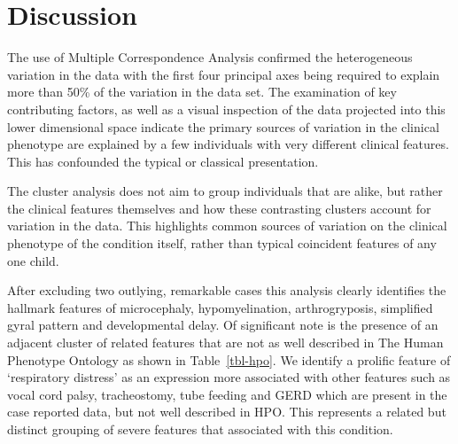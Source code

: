 \documentclass[
  authoryear,
  preprint,
  3p]{elsarticle}
\begin{document}
\hypertarget{discussion}{%
\section{Discussion}\label{discussion}}

The use of Multiple Correspondence Analysis confirmed the heterogeneous
variation in the data with the first four principal axes being required
to explain more than 50\% of the variation in the data set. The
examination of key contributing factors, as well as a visual inspection
of the data projected into this lower dimensional space indicate the
primary sources of variation in the clinical phenotype are explained by
a few individuals with very different clinical features. This has
confounded the typical or classical presentation.

The cluster analysis does not aim to group individuals that are alike,
but rather the clinical features themselves and how these contrasting
clusters account for variation in the data. This highlights common
sources of variation on the clinical phenotype of the condition itself,
rather than typical coincident features of any one child.

After excluding two outlying, remarkable cases this analysis clearly
identifies the hallmark features of microcephaly, hypomyelination,
arthrogryposis, simplified gyral pattern and developmental delay. Of
significant note is the presence of an adjacent cluster of related
features that are not as well described in The Human Phenotype Ontology
\citep{kohler2021human} as shown in Table~\ref{tbl-hpo}. We identify a
prolific feature of `respiratory distress' as an expression more
associated with other features such as vocal cord palsy, tracheostomy,
tube feeding and GERD which are present in the case reported data, but
not well described in HPO. This represents a related but distinct
grouping of severe features that associated with this condition.
\end{document}
